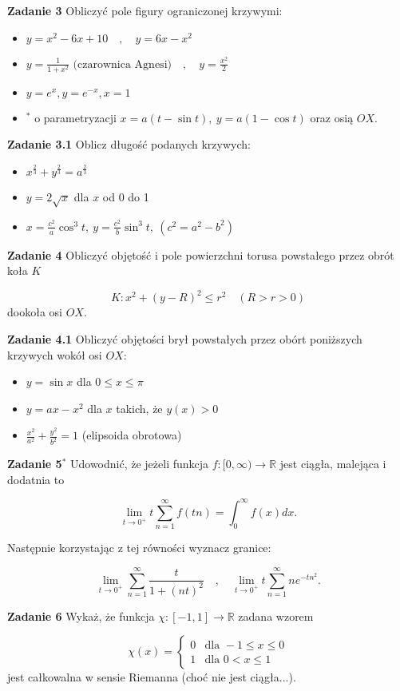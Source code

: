 \documentclass[a4paper,11pt]{article}
\begin{document}
\bigskip

\textbf{Zadanie 3} Obliczyć pole figury ograniczonej krzywymi:
\begin{itemize}
    \item  $y = x^2 - 6x + 10 \quad , \quad y = 6x - x^2$
    \item $y = \frac{1}{1+x^2} \text{~(czarownica Agnesi)} \quad , \quad 
        y = \frac{x^2}{2}$
    \item $y=e^x, y=e^{-x}, x =1$
    \item $^\ast$ o parametryzacji  $x = a(t-\sin t), ~ y = a(1-\cos t)$
        oraz osią $OX$.
\end{itemize}

\bigskip

\textbf{Zadanie 3.1} Oblicz długość podanych krzywych:

\begin{itemize}
    \item $x^{\frac{2}{3}} + y^{\frac{2}{3}} = a^{\frac{2}{3}}$ 
    \item $y = 2 \sqrt{x}$ dla $x$ od 0 do 1
    \item  $x = \frac{c^2}{a} \cos^3 t,~ y = \frac{c^2}{b} \sin^3 t,~ (c^2
        = a^2 - b^2)$
\end{itemize}

\bigskip

\textbf{Zadanie 4} Obliczyć objętość i pole powierzchni torusa powstałego
przez obrót koła $K$ 

\[
K: x^2 + (y-R)^2 \le r^2 \quad (R>r>0)
\]
dookoła osi $OX$.

\bigskip

\textbf{Zadanie 4.1} Obliczyć objętości brył powstałych przez obórt
poniższych krzywych wokół osi $OX$:

 \begin{itemize}
    \item $y = \sin x$ dla $0\le x \le \pi$
    \item $y = ax - x^2$ dla $x$ takich, że $y(x) >0$
    \item $\frac{x^2}{a^2} + \frac{y^2}{b^2} = 1$ (elipsoida obrotowa)
\end{itemize}

\bigskip

\textbf{Zadanie 5}$^\ast$ Udowodnić, że jeżeli funkcja $f : [0,\infty) →
\mathbb{R}$ jest ciągła, malejąca i dodatnia to

\[
\lim_{t\to 0^+} t \sum_{n=1}^\infty f(tn) = \int_{0}^\infty f(x) dx
.\] 

Następnie korzystając z tej równości wyznacz granice:

\[
\lim_{t\to 0^+} \sum_{n=1}^\infty \frac{t}{1+(nt)^2} 
\quad , \quad
\lim_{t\to 0^+} t \sum_{n=1}^\infty ne^{-tn^2}
.\] 

\bigskip

\textbf{Zadanie 6} Wykaż, że funkcja $\chi: [-1,1] \to \mathbb{R}$ zadana
wzorem

 \[
\chi(x) = 
\begin{cases}
    0 & \text{dla~} -1 \le x \le 0 \\
    1 & \text{dla~} 0 < x \le  1
\end{cases}
\] 
jest całkowalna w sensie Riemanna (choć nie jest ciągła...).

\bigskip
\end{document}
